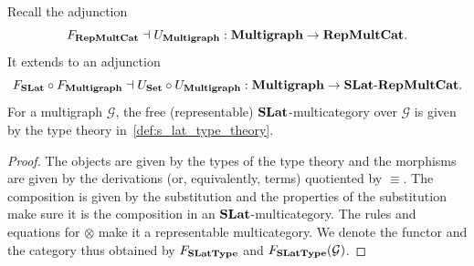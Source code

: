 \begin{theorem}
\label{theorem:free_slat_multicat}
  Recall the adjunction 
  \[
  F_{\mathbf{RepMultCat}} \dashv U_{\mathbf{Multigraph}} : \mathbf{Multigraph} \to \mathbf{RepMultCat}.
  \]
  It extends to an adjunction 
  \[
  F_{\mathbf{SLat}} \circ F_{\mathbf{Multigraph}} \dashv U_{\mathbf{Set}} \circ U_{\mathbf{Multigraph}} : \mathbf{Multigraph} \to \mathbf{SLat}\text{-}\mathbf{RepMultCat}.
  \]
  For a multigraph $\mathcal{G}$, the free (representable) $\mathbf{SLat}$-multicategory over $\mathcal{G}$ is given by the type theory in~\autoref{def:s_lat_type_theory}.
\end{theorem}
\begin{proof}
The objects are given by the types of the type theory and the morphisms are given by the derivations (or, equivalently, terms) quotiented by $\equiv$.
The composition is given by the substitution and the properties of the substitution make sure it is the composition in an $\mathbf{SLat}$-multicategory.
The rules and equations for $\otimes$ make it a representable multicategory.
We denote the functor and the category thus obtained by $F_{\mathbf{SLatType}}$ and $F_{\mathbf{SLatType}}(\mathcal{G})$.


\end{proof}
